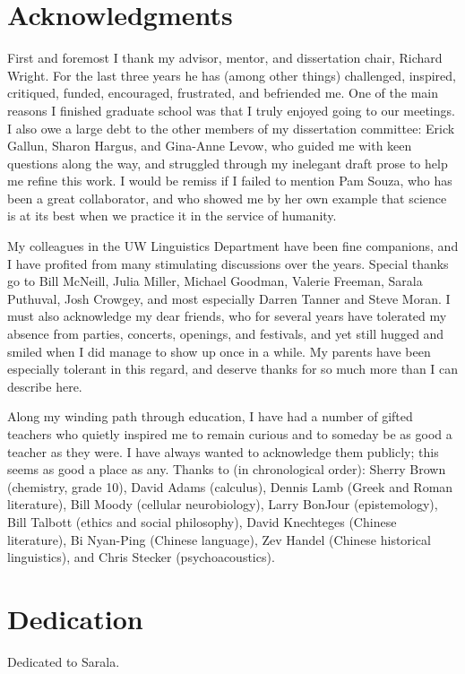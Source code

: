 \begin{spacing}{2}
\tableofcontents
\newpage

\listoffigures
\newpage

\listoftables
\newpage

\chapter*{Acknowledgments}
First and foremost I thank my advisor, mentor, and dissertation chair, Richard Wright.  For the last three years he has (among other things) challenged, inspired, critiqued, funded, encouraged, frustrated, and befriended me.  One of the main reasons I finished graduate school was that I truly enjoyed going to our meetings.  I also owe a large debt to the other members of my dissertation committee: Erick Gallun, Sharon Hargus, and Gina-Anne Levow, who guided me with keen questions along the way, and struggled through my inelegant draft prose to help me refine this work.  I would be remiss if I failed to mention Pam Souza, who has been a great collaborator, and who showed me by her own example that science is at its best when we practice it in the service of humanity.  

My colleagues in the UW Linguistics Department have been fine companions, and I have profited from many stimulating discussions over the years.  Special thanks go to Bill McNeill, Julia Miller, Michael Goodman, Valerie Freeman, Sarala Puthuval, Josh Crowgey, and most especially Darren Tanner and Steve Moran.  I must also acknowledge my dear friends, who for several years have tolerated my absence from parties, concerts, openings, and festivals, and yet still hugged and smiled when I did manage to show up once in a while.  My parents have been especially tolerant in this regard, and deserve thanks for so much more than I can describe here.

Along my winding path through education, I have had a number of gifted teachers who quietly inspired me to remain curious and to someday be as good a teacher as they were.  I have always wanted to acknowledge them publicly; this seems as good a place as any.  Thanks to (in chronological order): Sherry Brown (chemistry, grade 10), David Adams (calculus), Dennis Lamb (Greek and Roman literature), Bill Moody (cellular neurobiology), Larry BonJour (epistemology), Bill Talbott (ethics and social philosophy), David Knechteges (Chinese literature), Bi Nyan-Ping (Chinese language), Zev Handel (Chinese historical linguistics), and Chris Stecker (psychoacoustics).  
\newpage

\chapter*{Dedication}
Dedicated to Sarala.
\end{spacing}
